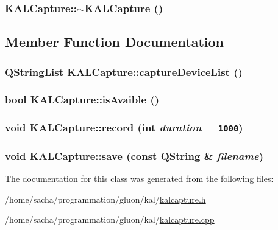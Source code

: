 \hypertarget{class_k_a_l_capture_1f9f32e7f9a0385672a46a707323c83b}{
\subsubsection[{$\sim$KALCapture}]{\setlength{\rightskip}{0pt plus 5cm}KALCapture::$\sim$KALCapture ()}}
\label{class_k_a_l_capture_1f9f32e7f9a0385672a46a707323c83b}




\subsection{Member Function Documentation}
\hypertarget{class_k_a_l_capture_65eb77b996ffb043ae7bbc99f9d6618c}{
\subsubsection[{captureDeviceList}]{\setlength{\rightskip}{0pt plus 5cm}QStringList KALCapture::captureDeviceList ()}}
\label{class_k_a_l_capture_65eb77b996ffb043ae7bbc99f9d6618c}


\hypertarget{class_k_a_l_capture_a3688490a6cd8c1a0bc9db8d61f06d6a}{
\subsubsection[{isAvaible}]{\setlength{\rightskip}{0pt plus 5cm}bool KALCapture::isAvaible ()}}
\label{class_k_a_l_capture_a3688490a6cd8c1a0bc9db8d61f06d6a}


\hypertarget{class_k_a_l_capture_cde1d57d48b79547596ee9e32f88c76d}{
\subsubsection[{record}]{\setlength{\rightskip}{0pt plus 5cm}void KALCapture::record (int {\em duration} = {\tt 1000})}}
\label{class_k_a_l_capture_cde1d57d48b79547596ee9e32f88c76d}


\hypertarget{class_k_a_l_capture_452ce1136b1b9ed6c11479fcd3913046}{
\subsubsection[{save}]{\setlength{\rightskip}{0pt plus 5cm}void KALCapture::save (const QString \& {\em filename})}}
\label{class_k_a_l_capture_452ce1136b1b9ed6c11479fcd3913046}




The documentation for this class was generated from the following files:\begin{CompactItemize}
\item 
/home/sacha/programmation/gluon/kal/\hyperlink{kalcapture_8h}{kalcapture.h}\item 
/home/sacha/programmation/gluon/kal/\hyperlink{kalcapture_8cpp}{kalcapture.cpp}\end{CompactItemize}
